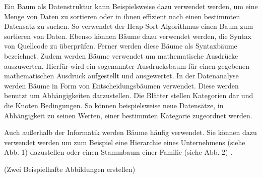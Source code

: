 Ein Baum als Datenstruktur kann Beispielsweise dazu verwendet werden, 
um eine Menge von Daten zu sortieren oder in ihnen effizient nach einen 
bestimmten Datensatz zu suchen. So verwendet der Heap-Sort-Algorithmus 
einen Baum zum sortieren von Daten. Ebenso können Bäume dazu verwendet 
werden, die Syntax von Quellcode zu überprüfen. Ferner werden diese Bäume 
als Syntaxbäume bezeichnet. Zudem werden Bäume verwendet um mathematische 
Ausdrücke auszuwerten. Hierfür wird ein sogenannter Ausdrucksbaum für einen 
gegebenen mathematischen Ausdruck aufgestellt und ausgewertet. In der 
Datenanalyse werden Bäume in Form von Entscheidungsbäumen verwendet. 
Diese werden benutzt um Abhängigkeiten darzustellen. Die Blätter stellen 
Kategorien dar und die Knoten Bedingungen. So können beispielsweise neue 
Datensätze, in Abhängigkeit zu seinen Werten, einer bestimmten Kategorie 
zugeordnet werden.

Auch außerhalb der Informatik werden Bäume häufig verwendet. Sie können 
dazu verwendet werden um zum Beispiel eine Hierarchie eines Unternehmens 
(siehe Abb. 1) dazustellen oder einen Stammbaum einer 
Familie (siehe Abb. 2) \cite[]{q4}.

(Zwei Beispielhafte Abbildungen erstellen)
